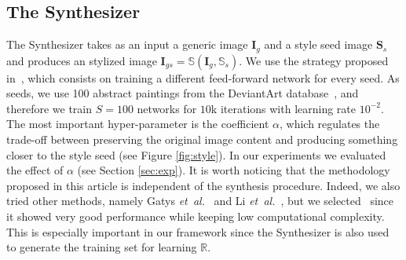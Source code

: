 \documentclass{sig-alternate-05-2015}
\begin{document}
\subsection{The Synthesizer}
\label{sec:synthesis}
The {Synthesizer} takes as an input a generic image $\textbf{I}_g$ and a style seed image $\textbf{S}_s$ and produces an stylized image $\mathbf{I}_{gs} = \mathbb{S}(\textbf{I}_g,\mathbb{S}_s)$. We use the strategy proposed in~\cite{ulyanov2016texture}, which consists on training a different feed-forward network for every seed. As seeds, we use 100 abstract paintings from the DeviantArt database~\cite{sartori2015affective}, and therefore we train $S=100$ networks for $10$k iterations with learning rate $10^{-2}$. The most important hyper-parameter is the coefficient $\alpha$, which regulates the trade-off between preserving the original image content and producing something closer to the style seed (see Figure \ref{fig:style}). In our experiments we evaluated the effect of $\alpha$ (see Section \ref{sec:exp}). %
It is worth noticing that the methodology proposed in this article is independent of the synthesis procedure. Indeed, we also tried other methods, namely Gatys \textit{et\ al.}~\cite{gatys2015neural} and Li \textit{et\ al.}~\cite{li2016precomputed}, but we selected~\cite{ulyanov2016texture} since it showed very good performance while keeping low computational complexity. This is especially important in our framework since the Synthesizer is also used to generate the training set for learning $\mathbb{R}$. %

\end{document}
